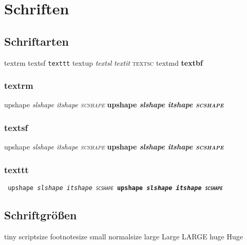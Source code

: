 \section{Schriften}
\subsection{Schriftarten}

\textrm{textrm} \textsf{textsf} \texttt{texttt}
\textup{textup} \textsl{textsl} \textit{textit} \textsc{textsc}
\textmd{textmd} \textbf{textbf}

\subsubsection{textrm}
\textrm{
  \textmd{\upshape upshape \slshape slshape \itshape itshape \scshape scshape}
  \textbf{\upshape upshape \slshape slshape \itshape itshape \scshape scshape}
}

\subsubsection{textsf}
\textsf{
  \textmd{\upshape upshape \slshape slshape \itshape itshape \scshape scshape}
  \textbf{\upshape upshape \slshape slshape \itshape itshape \scshape scshape}
}

\subsubsection{texttt}
\texttt{
  \textmd{\upshape upshape \slshape slshape \itshape itshape \scshape scshape}
  \textbf{\upshape upshape \slshape slshape \itshape itshape \scshape scshape}
}

\subsection{Schriftgrößen}
{
\tiny tiny
\scriptsize scriptsize
\footnotesize footnotesize
\small small
\normalsize normalsize
\large large
\Large Large
\LARGE LARGE
\huge huge
\Huge Huge
}
